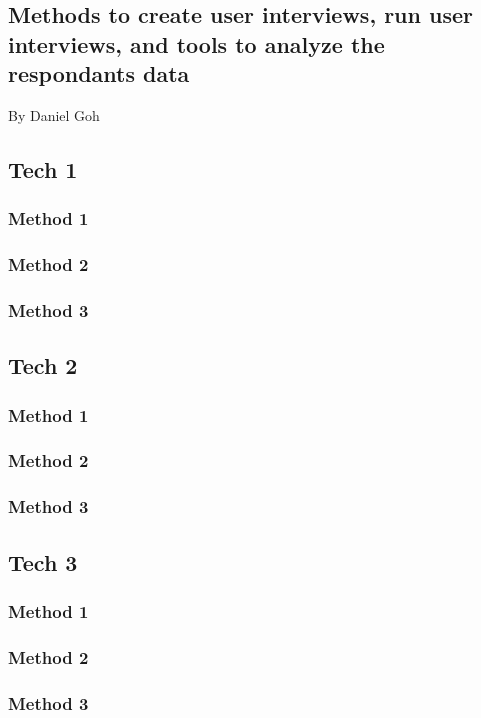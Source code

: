 \documentclass[10pt,journal,compsoc,draftclsnofoot]{IEEEtran}
\begin{document}
\begin{flushleft}
\newpage


\section{Methods to create user interviews, run user interviews, and tools to analyze the respondants data}
\large{By Daniel Goh}
\subsection{Tech 1}

\subsubsection{Method 1}

\subsubsection{Method 2}

\subsubsection{Method 3}

\subsection{Tech 2}

\subsubsection{Method 1}

\subsubsection{Method 2}

\subsubsection{Method 3}

\subsection{Tech 3}

\subsubsection{Method 1}

\subsubsection{Method 2}

\subsubsection{Method 3}

\end{flushleft}
\end{document}
